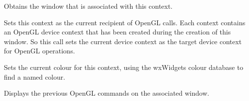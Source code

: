 
Obtains the window that is associated with this context.

\label{wxglcontextsetcurrent}


Sets this context as the current recipient of OpenGL calls.
Each context contains an OpenGL device context that has been created during
the creation of this window. So this call sets the current device context
as the target device context for OpenGL operations.

\label{wxglcontextsetcolour}


Sets the current colour for this context, using the wxWidgets colour database to find a named colour.

\label{wxglcontextswapbuffers}


Displays the previous OpenGL commands on the associated window.

